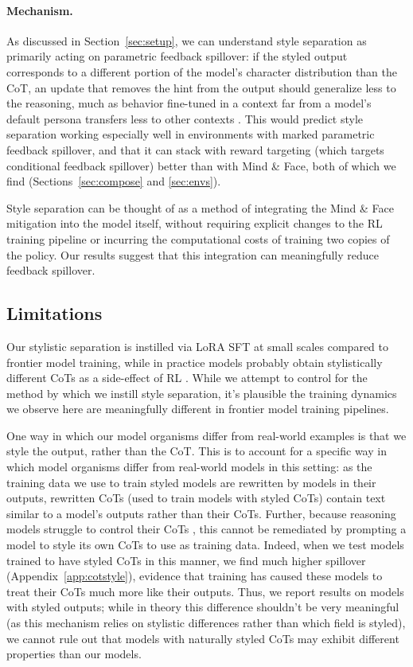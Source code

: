 \documentclass{article}
\begin{document}
\paragraph{Mechanism.} As discussed in Section~\ref{sec:setup}, we can understand style separation as primarily acting on parametric feedback spillover: if the styled output corresponds to a different portion of the model's character distribution \citep{marks2026psm} than the CoT, an update that removes the hint from the output should generalize less to the reasoning, much as behavior fine-tuned in a context far from a model's default persona transfers less to other contexts \citep{zhao2026persona}. This would predict style separation working especially well in environments with marked parametric feedback spillover, and that it can stack with reward targeting (which targets conditional feedback spillover) better than with Mind \& Face, both of which we find (Sections~\ref{sec:compose} and \ref{sec:envs}).

Style separation can be thought of as a method of integrating the Mind \& Face mitigation into the model itself, without requiring explicit changes to the RL training pipeline or incurring the computational costs of training two copies of the policy. Our results suggest that this integration can meaningfully reduce feedback spillover.

\subsection{Limitations}
\label{sec:limitations}
Our stylistic separation is instilled via LoRA SFT at small scales compared to frontier model training, while in practice models probably obtain stylistically different CoTs as a side-effect of RL \citep{guo2025deepseek,schoen2025antischeming,sullivan2026drift}. While we attempt to control for the method by which we instill style separation, it's plausible the training dynamics we observe here are meaningfully different in frontier model training pipelines.

One way in which our model organisms differ from real-world examples is that we style the output, rather than the CoT. This is to account for a specific way in which model organisms differ from real-world models in this setting: as the training data we use to train styled models are rewritten by models in their outputs, rewritten CoTs (used to train models with styled CoTs) contain text similar to a model's outputs rather than their CoTs. Further, because reasoning models struggle to control their CoTs \citep{chen2026controllability}, this cannot be remediated by prompting a model to style its own CoTs to use as training data. Indeed, when we test models trained to have styled CoTs in this manner, we find much higher spillover (Appendix~\ref{app:cotstyle}), evidence that training has caused these models to treat their CoTs much more like their outputs. Thus, we report results on models with styled outputs; while in theory this difference shouldn't be very meaningful (as this mechanism relies on stylistic differences rather than which field is styled), we cannot rule out that models with naturally styled CoTs may exhibit different properties than our models.
\end{document}
